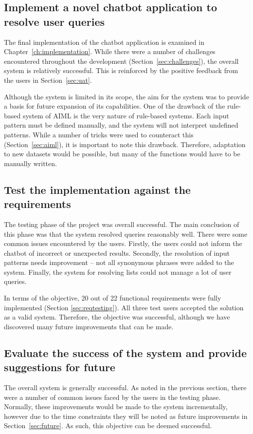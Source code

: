 \subsection{Implement a novel chatbot application to resolve user queries}
The final implementation of the chatbot application is examined in Chapter~\ref{ch:implementation}. While there were a number of challenges encountered throughout the development (Section~\ref{sec:challenges}), the overall system is relatively successful. This is reinforced by the positive feedback from the users in Section~\ref{sec:uat}.

Although the system is limited in its scope, the aim for the system was to provide a basis for future expansion of its capabilities. One of the drawback of the rule-based system of AIML is the very nature of rule-based systems. Each input pattern must be defined manually, and the system will not interpret undefined patterns. While a number of tricks were used to counteract this (Section~\ref{sec:aiml}), it is important to note this drawback. Therefore, adaptation to new datasets would be possible, but many of the functions would have to be manually written. 

\subsection{Test the implementation against the requirements}
The testing phase of the project was overall successful. The main conclusion of this phase was that the system resolved queries reasonably well. There were some common issues encountered by the users. Firstly, the users could not inform the chatbot of incorrect or unexpected results. Secondly, the resolution of input patterns needs improvement -- not all synonymous phrases were added to the system. Finally, the system for resolving lists could not manage a lot of user queries.

In terms of the objective, 20 out of 22 functional requirements were fully implemented (Section \ref{sec:reqtesting}). All three test users accepted the solution as a valid system. Therefore, the objective was successful, although we have discovered many future improvements that can be made.

\subsection{Evaluate the success of the system and provide suggestions for future}
The overall system is generally successful. As noted in the previous section, there were a number of common issues faced by the users in the testing phase. Normally, these improvements would be made to the system incrementally, however due to the time constraints they will be noted as future improvements in Section~\ref{sec:future}. As such, this objective can be deemed successful.

